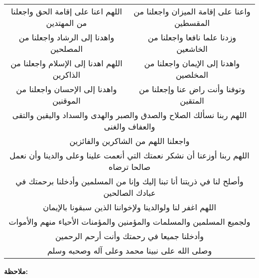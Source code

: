 \begin{center}
\begin{tabular}{cc}
    اللهم اعنا على إقامة الحق واجعلنا من المهتدين & 
    واعنا على إقامة الميزان واجعلنا من المقسطين  \\
    واهدنا إلى الرشاد واجعلنا من المصلحين & 
    وزدنا علما نافعا واجعلنا من الخاشعين \\
    اللهم اهدنا إلى الإسلام واجعلنا من الذاكرين & 
    واهدنا إلى الإيمان واجعلنا من المخلصين \\
    واهدنا إلى الإحسان واجعلنا من الموقنين & 
    وتوفنا وأنت راض عنا وإجعلنا من المتقين \\
    \multicolumn{2}{c}{اللهم ربنا نسألك الصلاح والصدق والصبر والهدى والسداد  واليقين والتقى والعفاف والغنى} \\
    \multicolumn{2}{c}{واجعلنا اللهم من الشاكرين والفائزين} \\
    \multicolumn{2}{c}{اللهم ربنا أوزعنا أن نشكر نعمتك التي أنعمت علينا وعلى والدينا وأن نعمل صالحا ترضاه} \\
    \multicolumn{2}{c}{وأصلح لنا في ذريتنا أنا تبنا إليك وإنا من المسلمين وأدخلنا برحمتك في عبادك الصالحين} \\
    \multicolumn{2}{c}{اللهم اغفر لنا ولوالدينا ولإخواننا الذين سبقونا بالإيمان} \\
    \multicolumn{2}{c}{ولجميع المسلمين والمسلمات والمؤمنين والمؤمنات الأحياء منهم والأموات} \\
    \multicolumn{2}{c}{وأدخلنا جميعا في رحمتك وأنت أرحم الرحمين} \\
    \multicolumn{2}{c}{وصلى الله على نبينا محمد وعلى آله وصحبه وسلم} \\
\end{tabular}
\end{center}

\newpage
\vspace*{\fill}
\textbf{ملاحظة:}

